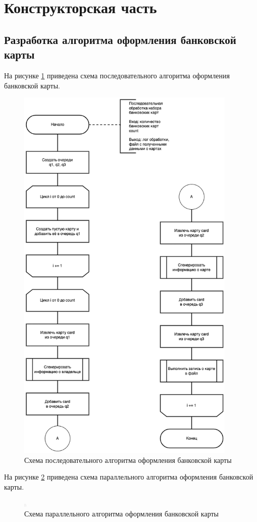 \section{Конструкторская часть}

\subsection*{Разработка алгоритма оформления банковской карты}

На рисунке \ref{img:merge} приведена схема последовательного алгоритма оформления банковской карты.
\begin{figure}[hbtp]
	\centering
	\includegraphics[width=105mm]{images/linear}
	\caption{Схема последовательного алгоритма оформления банковской карты}
	\label{img:merge}
\end{figure}
\newpage
На рисунке \ref{img:thread} приведена схема параллельного алгоритма оформления банковской карты.
\begin{figure}[hbtp]
	\centering
	\includegraphics[width=1mm]{images/threads}
	\caption{Схема параллельного алгоритма оформления банковской карты}
	\label{img:thread}
\end{figure}
\newpage
